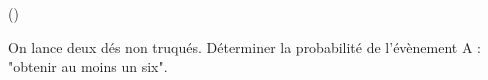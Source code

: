 \begin{exercice}\label{exo3-2} (\minsyndical)

On lance deux d\'es non truqu\'es. D\'eterminer la probabilit\'e de l'\'ev\`enement A : 
"obtenir au moins un six".\\

\end{exercice}
